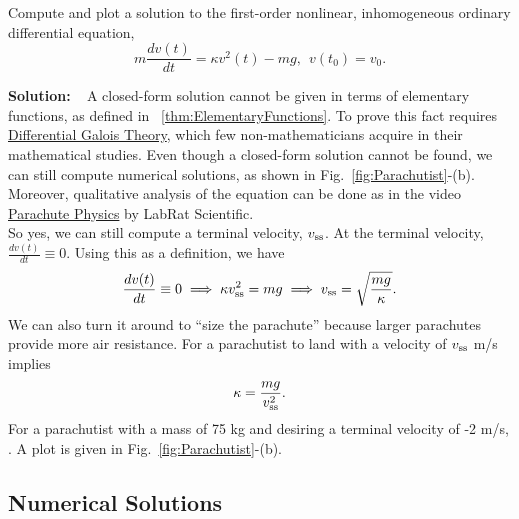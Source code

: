 \bigskip


\begin{example} 
\label{ex:ChuteODE04}
Compute and plot a solution to the first-order nonlinear, inhomogeneous ordinary differential equation,  
\begin{equation}
\label{eq:1stOrderNonlinearHomogeneousExercise}
    m \frac{dv(t)}{dt} =   \kappa v^2(t) - mg,~~v(t_0) = v_0.
\end{equation}    
\end{example}
\textbf{Solution:} \Ans~ A closed-form solution cannot be given in terms of elementary functions, as defined in  ~\ref{thm:ElementaryFunctions}. To prove this fact requires \href{https://en.wikipedia.org/wiki/Differential_Galois_theory}{Differential Galois Theory}, which few non-mathematicians acquire in their mathematical studies. Even though a closed-form solution cannot be found, we can still compute numerical solutions, as shown in Fig.~\ref{fig:Parachutist}-(b). Moreover, qualitative analysis of the equation can be done as in the video \href{https://youtu.be/3AIA1HBsTVI}{Parachute Physics} by 
LabRat Scientific. \\

So yes, we can still compute a terminal velocity, $v_{\rm ss}$. At the terminal velocity, $\frac{dv(t)}{dt} \equiv 0$. Using this as a definition, we have
$$\frac{dv(t)}{dt} \equiv 0 \implies  \kappa v^2_{\rm ss} = mg \implies  v_{\rm ss} = \sqrt{\frac{mg}{\kappa}}.$$
We can also turn it around to ``size the parachute'' because larger parachutes provide more air resistance. For a parachutist to land with a velocity of $v_{\rm ss}$ m/s implies 
$$ \kappa = \frac{mg}{v^2_{\rm ss}}.$$ 
For a parachutist with a mass of 75 kg and desiring a terminal velocity of -2 m/s, . A plot is given in Fig.~\ref{fig:Parachutist}-(b).\\




\Qed


\subsection{Numerical Solutions}



